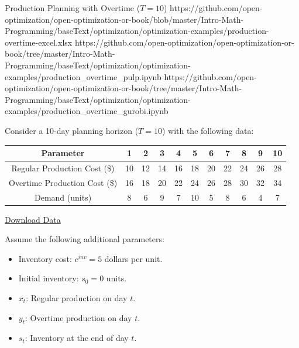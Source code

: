 \begin{examplewithallcode}{Production Planning with Overtime (\(T = 10\))}
{https://github.com/open-optimization/open-optimization-or-book/blob/master/Intro-Math-Programming/baseText/optimization/optimization-examples/production-overtime-excel.xlsx}
{https://github.com/open-optimization/open-optimization-or-book/tree/master/Intro-Math-Programming/baseText/optimization/optimization-examples/production_overtime_pulp.ipynb}
{https://github.com/open-optimization/open-optimization-or-book/tree/master/Intro-Math-Programming/baseText/optimization/optimization-examples/production_overtime_gurobi.ipynb}

Consider a 10-day planning horizon (\(T=10\)) with the following data:


\begin{center}
\begin{tabular}{@{}c*{10}{c}@{}}
\toprule
\textbf{Parameter}                & 1   & 2   & 3   & 4   & 5   & 6   & 7   & 8   & 9   & 10 \\
\midrule
Regular Production Cost (\$)      & 10  & 12  & 14  & 16  & 18  & 20  & 22  & 24  & 26  & 28 \\
Overtime Production Cost (\$)      & 16  & 18  & 20  & 22  & 24  & 26  & 28  & 30  & 32  & 34 \\
Demand (units)                    & 8   & 6   & 9   & 7   & 10  & 5   & 8   & 6   & 4   & 7 \\
\bottomrule
\end{tabular}
\par{}\label{tab:modeling-sums-tab02}%
\href{https://github.com/open-optimization/open-optimization-or-book/blob/master/Intro-Math-Programming/baseText/optimization/optimization-examples/production_costs.xlsx}{Download Data}
\end{center}

Assume the following additional parameters:
\begin{itemize}
    \item Inventory cost: \( c^{inv} = 5 \) dollars per unit.
    \item Initial inventory: \( s_0 = 0 \) units.
\end{itemize}

\begin{itemize}
    \item \( x_t \): Regular production on day \(t\).
    \item \( y_t \): Overtime production on day \(t\).
    \item \( s_t \): Inventory at the end of day \(t\).
\end{itemize}


\end{examplewithallcode}
